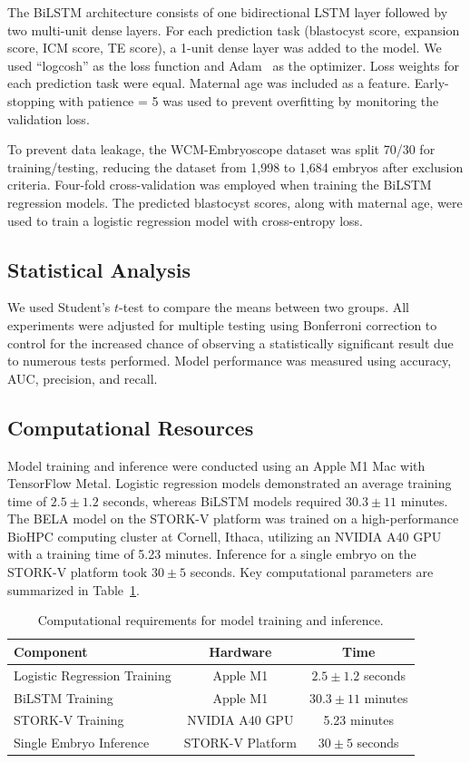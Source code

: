 \documentclass[12pt]{article}
\begin{document}
The BiLSTM architecture consists of one bidirectional LSTM layer followed by two multi-unit dense layers. For each prediction task (blastocyst score, expansion score, ICM score, TE score), a 1-unit dense layer was added to the model. We used ``logcosh'' as the loss function and Adam~\citep{kingma2014adam} as the optimizer. Loss weights for each prediction task were equal. Maternal age was included as a feature. Early-stopping with patience = 5 was used to prevent overfitting by monitoring the validation loss.

To prevent data leakage, the WCM-Embryoscope dataset was split 70/30 for training/testing, reducing the dataset from 1,998 to 1,684 embryos after exclusion criteria. Four-fold cross-validation was employed when training the BiLSTM regression models. The predicted blastocyst scores, along with maternal age, were used to train a logistic regression model with cross-entropy loss.

\subsection{Statistical Analysis}

We used Student's $t$-test to compare the means between two groups. All experiments were adjusted for multiple testing using Bonferroni correction to control for the increased chance of observing a statistically significant result due to numerous tests performed. Model performance was measured using accuracy, AUC, precision, and recall.

\subsection{Computational Resources}

Model training and inference were conducted using an Apple M1 Mac with TensorFlow Metal. Logistic regression models demonstrated an average training time of $2.5 \pm 1.2$ seconds, whereas BiLSTM models required $30.3 \pm 11$ minutes. The BELA model on the STORK-V platform was trained on a high-performance BioHPC computing cluster at Cornell, Ithaca, utilizing an NVIDIA A40 GPU with a training time of 5.23 minutes. Inference for a single embryo on the STORK-V platform took $30 \pm 5$ seconds. Key computational parameters are summarized in Table~\ref{tab:compute}.

\begin{table}[H]
\centering
\caption{Computational requirements for model training and inference.}
\label{tab:compute}
\begin{tabular}{lcc}
\toprule
\textbf{Component} & \textbf{Hardware} & \textbf{Time} \\
\midrule
Logistic Regression Training & Apple M1 & $2.5 \pm 1.2$ seconds \\
BiLSTM Training & Apple M1 & $30.3 \pm 11$ minutes \\
STORK-V Training & NVIDIA A40 GPU & 5.23 minutes \\
Single Embryo Inference & STORK-V Platform & $30 \pm 5$ seconds \\
\bottomrule
\end{tabular}
\end{table}
\end{document}
